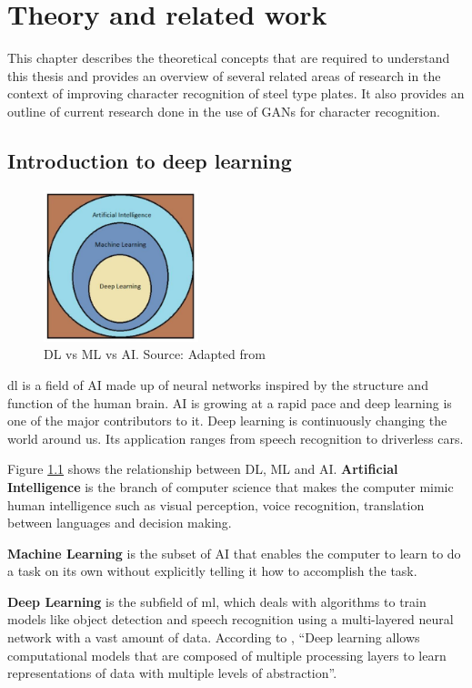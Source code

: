 \chapter{Theory and related work}\label{ch:related}
This chapter describes the theoretical concepts that are required to understand this thesis and provides an overview of several related areas of research in the context of improving character recognition of steel type plates. It also provides an outline of current research done in the use of GANs for character recognition. 

\section{Introduction to deep learning}
	 
\begin{figure}
\centering
\includegraphics[width=0.4\textwidth]{images/introdl.eps}
\caption[DL vs ML vs AI]{DL vs ML vs AI. Source: Adapted from \citep{aidlml} }
\label{fig:relation}
\end{figure}

\gls{dl} is a field of AI made up of neural networks inspired by the structure and function of the human brain. AI is growing at a rapid pace and deep learning is one of the major contributors to it. Deep learning is continuously changing the world around us. Its application ranges from speech recognition to driverless cars.

Figure \ref{fig:relation} shows the relationship between DL, ML and AI.
\textbf{Artificial Intelligence} is the branch of computer science that makes the computer mimic human intelligence such as visual perception, voice recognition, translation between languages and decision making.

\textbf{Machine Learning} is the subset of AI that enables the computer to learn to do a task on its own without explicitly telling it how to accomplish the task.

\textbf{Deep Learning} is the subfield of \gls{ml}, which deals with algorithms to train models like object detection and speech recognition using a multi-layered neural network with a vast amount of data. According to \citep{lecun2015deep},
“Deep learning allows computational models that are composed of multiple processing layers to learn representations of data with multiple levels of abstraction”. 

